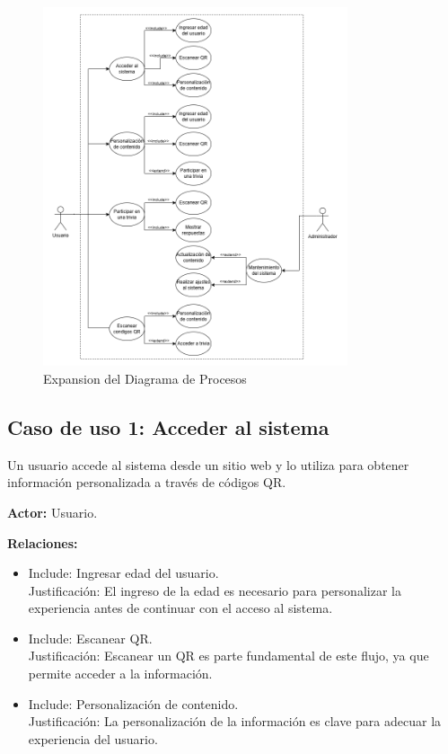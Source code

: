 \documentclass{report}
\begin{document}
    \begin{figure}[H]
        \centering
        \includegraphics[width=0.8\textwidth]{Casos de uso.png}
        \caption{Expansion del Diagrama de Procesos}
    \end{figure}

    \subsection*{Caso de uso 1: Acceder al sistema}
    Un usuario accede al sistema desde un sitio web y lo utiliza para obtener información personalizada a través de códigos QR.
    
    \textbf{Actor:} Usuario.

    \textbf{Relaciones:}
    \begin{itemize}
        \item Include: Ingresar edad del usuario.\\
        Justificación: El ingreso de la edad es necesario para personalizar la experiencia antes de continuar con el acceso al sistema.
        \item Include: Escanear QR.\\
        Justificación: Escanear un QR es parte fundamental de este flujo, ya que permite acceder a la información.
        \item Include: Personalización de contenido.\\
        Justificación: La personalización de la información es clave para adecuar la experiencia del usuario.
    \end{itemize}
\end{document}
